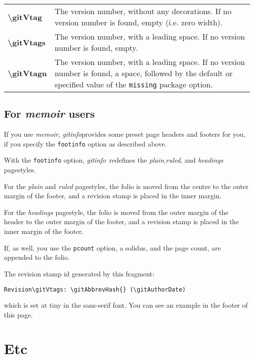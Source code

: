 \documentclass[a4paper,12pt,twoside,openany]{memoir}
\newcommand{\sfit}[1]{\textit{#1}}
\newcommand{\tpname}{\sfit{gitinfo}}
\begin{document}
\noindent
\begin{tabularx}{\textwidth}{@{}>{\ttfamily\bfseries\textbackslash}lX@{}}
gitVtag&
    The version number, without any decorations. If no version number is found,
    empty (i.e. zero width).
\\
gitVtags&
    The version number, with a leading space. If no version number is found,
    empty.
\\
gitVtagn&
    The version number, with a leading space.
    If no version number is found, a space,
    followed by the default or specified value of
    the \texttt{missing} package option.
\\
\end{tabularx}

\section{For \sfit{memoir} users}
If you use \sfit{memoir}, \tpname provides some preset page
headers and footers for you,
if you specify the \texttt{footinfo} option as described above.

With the \texttt{footinfo} option, \tpname\ redefines
the \sfit{plain},\sfit{ruled}, and \sfit{headings} pagestyles.

For the \sfit{plain} and \sfit{ruled} pagestyles,
the folio is moved from the centre to the outer margin of the footer,
and a revision stamp is placed in the inner margin.

For the \sfit{headings} pagestyle,
the folio is moved from the outer margin of the header
to the outer margin of the footer,
and a revision stamp is placed in the inner margin of the footer.

If, as well, you use the \texttt{pcount} option, a solidus, and the page count,
are appended to the folio.

The revision stamp id generated by this fragment:
\vspace{0.5\baselineskip}

\noindent
\verb!Revision\gitVtags: \gitAbbrevHash{} (\gitAuthorDate)!
\vspace{0.5\baselineskip}

\noindent
which is set at tiny in the sans-serif font.
You can see an example in the footer of this page.
\chapter{Etc}
\end{document}
